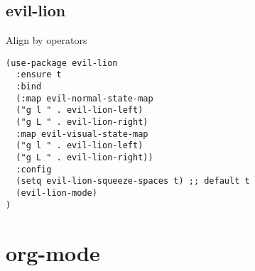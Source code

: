 \documentclass[11pt]{article}
\begin{document}
\subsection*{evil-lion}
\label{sec:org927918d}

Align by operators

\begin{verbatim}
(use-package evil-lion
  :ensure t
  :bind
  (:map evil-normal-state-map
  ("g l " . evil-lion-left)
  ("g L " . evil-lion-right)
  :map evil-visual-state-map
  ("g l " . evil-lion-left)
  ("g L " . evil-lion-right))
  :config
  (setq evil-lion-squeeze-spaces t) ;; default t
  (evil-lion-mode)
)
\end{verbatim}

\section*{org-mode}
\label{sec:org810bc70}
\end{document}
